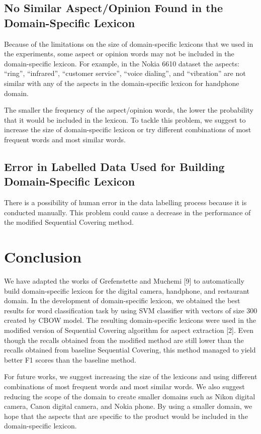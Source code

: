\documentclass[a4paper,conference]{IEEEtran}
\begin{document}
\subsection{No Similar Aspect/Opinion Found in the Domain-Specific Lexicon}
Because of the limitations on the size of domain-specific lexicons that we used in the experiments, some aspect or opinion words may not be included in the domain-specific lexicon. For example, in the Nokia 6610 dataset the aspects: “ring”, “infrared”, “customer service”, “voice dialing”, and “vibration” are not similar with any of the aspects in the domain-specific lexicon for handphone domain.

The smaller the frequency of the aspect/opinion words, the lower the probability that it would be included in the lexicon. To tackle this problem, we suggest to increase the size of domain-specific lexicon or try different combinations of most frequent words and most similar words.

\subsection{Error in Labelled Data Used for Building Domain-Specific Lexicon}
There is a possibility of human error in the data labelling process because it is conducted manually. This problem could cause a decrease in the performance of the modified Sequential Covering method.


\section{Conclusion}
We have adapted the works of Grefenstette and Muchemi [9] to automatically build domain-specific lexicon for the digital camera, handphone, and restaurant domain. In the development of domain-specific lexicon, we obtained the best results for word classification task by using SVM classifier with vectors of size 300 created by CBOW model. The resulting domain-specific lexicons were used in the modified version of Sequential Covering algorithm for aspect extraction [2]. Even though the recalls obtained from the modified method are still lower than the recalls obtained from baseline Sequential Covering, this method managed to yield better F1 scores than the baseline method.

For future works, we suggest increasing the size of the lexicons and using different combinations of most frequent words and most similar words. We also suggest reducing the scope of the domain to create smaller domains such as Nikon digital camera, Canon digital camera, and Nokia phone. By using a smaller domain, we hope that the aspects that are specific to the product would be included in the domain-specific lexicon.
\end{document}
